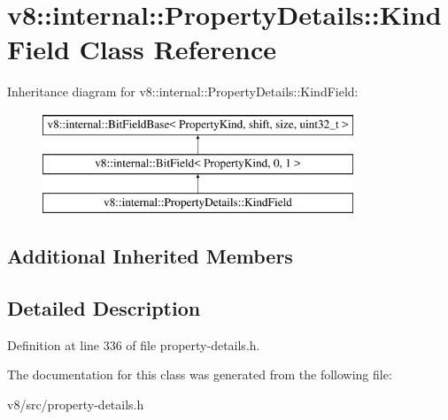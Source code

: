 \hypertarget{classv8_1_1internal_1_1PropertyDetails_1_1KindField}{}\section{v8\+:\+:internal\+:\+:Property\+Details\+:\+:Kind\+Field Class Reference}
\label{classv8_1_1internal_1_1PropertyDetails_1_1KindField}
Inheritance diagram for v8\+:\+:internal\+:\+:Property\+Details\+:\+:Kind\+Field\+:\begin{figure}[H]
\begin{center}
\leavevmode
\includegraphics[height=3.000000cm]{classv8_1_1internal_1_1PropertyDetails_1_1KindField}
\end{center}
\end{figure}
\subsection*{Additional Inherited Members}


\subsection{Detailed Description}


Definition at line 336 of file property-\/details.\+h.



The documentation for this class was generated from the following file\+:\begin{DoxyCompactItemize}
\item 
v8/src/property-\/details.\+h\end{DoxyCompactItemize}

